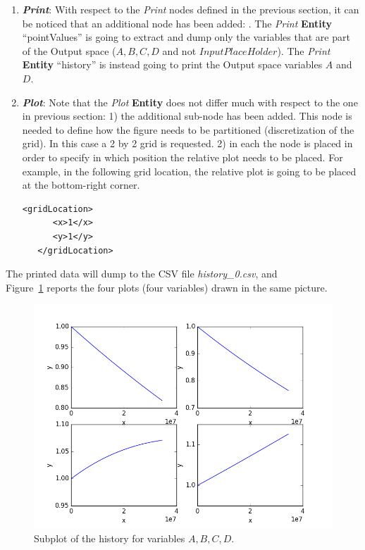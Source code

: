 \begin{enumerate}
   \item \textbf{\textit{Print}}:
   With respect to the \textit{Print} nodes defined in the previous section, it can
   be noticed that an additional node has been added: . The \textit{Print} \textbf{Entity}
   ``pointValues'' is going to extract and dump only the variables that are part of the Output space
   ($A,B,C,D$ and not $InputPlaceHolder$).  The \textit{Print} \textbf{Entity} ``history'' is instead going to print
   the Output space variables $A$ and $D$.

   \item \textbf{\textit{Plot}}:
 Note that the  \textit{Plot} \textbf{Entity} does not differ much with respect to the one in
 previous section: 1) the additional sub-node   has been added.
 This node is needed to define how the figure needs to be partitioned (discretization of the grid). In this case
 a 2 by 2 grid is requested. 2) in each  the node  is placed in
 order to specify in which position the relative plot needs to be placed. For example, in the following grid
 location, the relative plot is going to be placed at the bottom-right corner.
 \begin{lstlisting}[style=XML,morekeywords={arg,extension,pauseAtEnd,overwrite}]
   <gridLocation>
      <x>1</x>
      <y>1</y>
   </gridLocation>
  \end{lstlisting}
\end{enumerate}

The printed data will dump to the CSV file \textit{history\_0.csv}, and \\Figure~\ref{fig:historySubPlotLine} reports the four plots (four variables) drawn in the same picture.

\begin{figure}[h!]
  \centering
  \includegraphics[scale=0.7]{../../tests/framework/user_guide/SingleRuns/gold/subPlot/1-historyPlot_line-line-line-line.png}
  \caption{Subplot of the history for variables $A,B,C,D$.}
  \label{fig:historySubPlotLine}
\end{figure}
